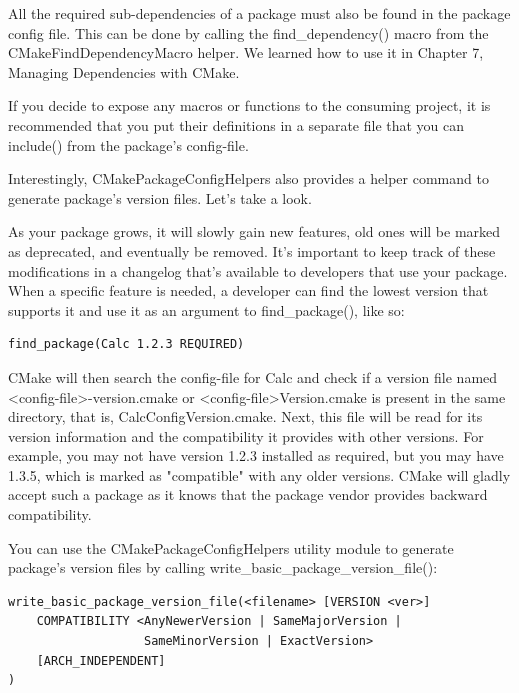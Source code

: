 All the required sub-dependencies of a package must also be found in the package config file. This can be done by calling the find\_dependency() macro from the CMakeFindDependencyMacro helper. We learned how to use it in Chapter 7, Managing Dependencies with CMake.

If you decide to expose any macros or functions to the consuming project, it is recommended that you put their definitions in a separate file that you can include() from the package's config-file.

Interestingly, CMakePackageConfigHelpers also provides a helper command to generate package's version files. Let's take a look.


As your package grows, it will slowly gain new features, old ones will be marked as deprecated, and eventually be removed. It's important to keep track of these modifications in a changelog that's available to developers that use your package. When a specific feature is needed, a developer can find the lowest version that supports it and use it as an argument to find\_package(), like so:

\begin{lstlisting}[style=styleCMake]
find_package(Calc 1.2.3 REQUIRED)
\end{lstlisting}

CMake will then search the config-file for Calc and check if a version file named <config-file>-version.cmake or <config-file>Version.cmake is present in the same directory, that is, CalcConfigVersion.cmake. Next, this file will be read for its version information and the compatibility it provides with other versions. For example, you may not have version 1.2.3 installed as required, but you may have 1.3.5, which is marked as "compatible" with any older versions. CMake will gladly accept such a package as it knows that the package vendor provides backward compatibility.

You can use the CMakePackageConfigHelpers utility module to generate package's version files by calling write\_basic\_package\_version\_file():

\begin{lstlisting}[style=styleCMake]
write_basic_package_version_file(<filename> [VERSION <ver>]
	COMPATIBILITY <AnyNewerVersion | SameMajorVersion |
				   SameMinorVersion | ExactVersion>
	[ARCH_INDEPENDENT]
)
\end{lstlisting}

